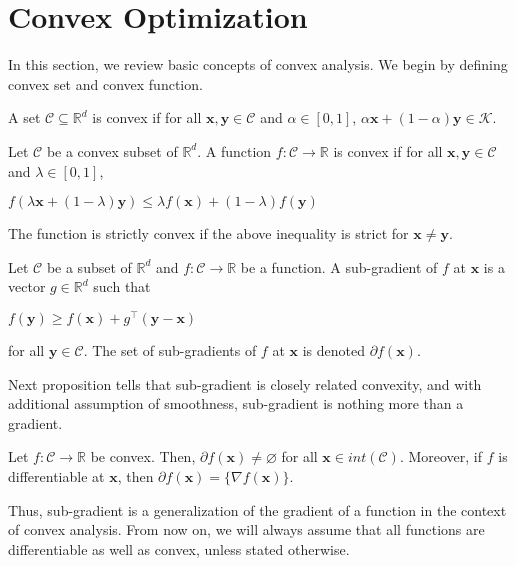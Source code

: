 \documentclass[12pt, a4paper]{report}
\begin{document}
\section{Convex Optimization}
In this section, we review basic concepts of convex analysis. We begin by defining convex set and convex function.
\begin{defn}
A set $ \mathcal{C} \subseteq \mathbb{R}^{d} $ is convex if for all $\mathbf{x}, \mathbf{y} \in \mathcal{C}$ and $\alpha \in [0, 1]$, $\alpha \mathbf{x} + (1 - \alpha) \mathbf{y} \in \mathcal{K}$.
\end{defn}
\begin{defn}
Let $\mathcal{C}$ be a convex subset of $\mathbb{R}^d$. A function $f: \mathcal{C} \rightarrow \mathbb{R}$ is convex if for all $\mathbf{x}, \mathbf{y} \in \mathcal{C}$ and $\lambda \in [0, 1]$,
\begin{center}
    $f(\lambda \mathbf{x} + (1-\lambda) \mathbf{y}) \leq \lambda f(\mathbf{x}) + (1 - \lambda)f(\mathbf{y})$
\end{center}
The function is strictly convex if the above inequality is strict for $\mathbf{x} \neq \mathbf{y}$.
\end{defn}

\begin{defn}
Let $\mathcal{C}$ be a subset of $\mathbb{R}^d$ and $f: \mathcal{C} \rightarrow \mathbb{R}$ be a function. A sub-gradient of $f$ at $\mathbf{x}$ is a vector $g \in \mathbb{R}^d$ such that
\begin{center}
    $f(\mathbf{y}) \geq f(\mathbf{x}) + g^\top(\mathbf{y} - \mathbf{x})$
\end{center}
for all $\mathbf{y} \in \mathcal{C}$. The set of sub-gradients of $f$ at $\mathbf{x}$ is denoted $ \partial f(\mathbf{x})$.
\end{defn}

Next proposition tells that sub-gradient is closely related convexity, and with additional assumption of smoothness, sub-gradient is nothing more than a gradient.
\begin{prop} \label{prop:grad-is-subgrad}
Let $f: \mathcal{C} \rightarrow \mathbb{R}$ be convex. Then, $\partial f(\mathbf{x}) \neq \varnothing$ for all $\mathbf{x} \in int(\mathcal{C})$. Moreover, if $f$ is differentiable at $\mathbf{x}$, then $\partial f(\mathbf{x}) = \{\nabla f(\mathbf{x})\}$.
\end{prop}
Thus, sub-gradient is a generalization of the gradient of a function in the context of convex analysis. From now on, we will always assume that all functions are differentiable as well as convex, unless stated otherwise.  
\end{document}
